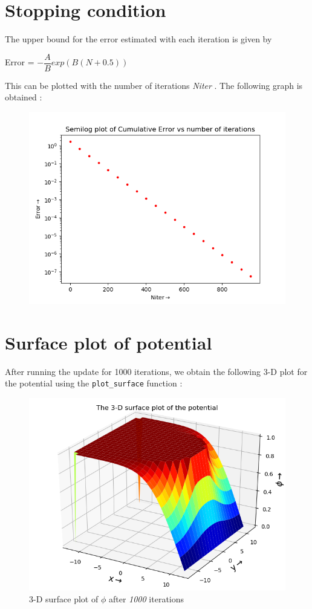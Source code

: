 \documentclass[11pt, a4paper]{article}
\begin{document}
\section*{Stopping condition }
The upper bound for the error estimated with each iteration is given by \\
\begin{center}
Error = $-\dfrac{A}{B} exp(B(N+0.5))$ 
\end{center}

This can be plotted with the number of iterations \textit{Niter} . The following graph is obtained  :
\begin{figure}[!h]
\centering
\includegraphics[scale=0.4]{Cumulative_error.png}
\caption{}
\end{figure}

\section*{Surface plot of potential}
After running the update for 1000 iterations, we obtain the following 3-D plot for the potential using the \texttt{plot\_surface} function :  

\begin{figure}[!htb]
\centering
\includegraphics[scale=0.5]{3-d.png}
\caption{3-D surface plot of $\phi$  after \textit{1000} iterations}
\label{fig:2}
\end{figure}
\end{document}
